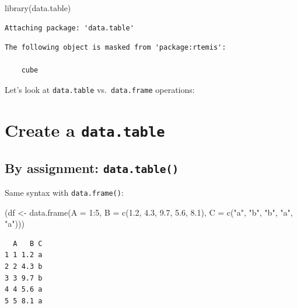 \documentclass[
]{book}
\newenvironment{Shaded}{\begin{snugshade}}{\end{snugshade}}
\newcommand{\AttributeTok}[1]{\textcolor[rgb]{0.77,0.63,0.00}{#1}}
\newcommand{\DecValTok}[1]{\textcolor[rgb]{0.00,0.00,0.81}{#1}}
\newcommand{\FloatTok}[1]{\textcolor[rgb]{0.00,0.00,0.81}{#1}}
\newcommand{\FunctionTok}[1]{\textcolor[rgb]{0.00,0.00,0.00}{#1}}
\newcommand{\NormalTok}[1]{#1}
\newcommand{\OtherTok}[1]{\textcolor[rgb]{0.56,0.35,0.01}{#1}}
\newcommand{\SpecialCharTok}[1]{\textcolor[rgb]{0.00,0.00,0.00}{#1}}
\newcommand{\StringTok}[1]{\textcolor[rgb]{0.31,0.60,0.02}{#1}}
\begin{document}
\begin{Shaded}
\begin{Highlighting}[]
\FunctionTok{library}\NormalTok{(data.table)}
\end{Highlighting}
\end{Shaded}

\begin{verbatim}
Attaching package: 'data.table'
\end{verbatim}

\begin{verbatim}
The following object is masked from 'package:rtemis':

    cube
\end{verbatim}

Let's look at \texttt{data.table} vs.~\texttt{data.frame} operations:

\hypertarget{create-a-data.table}{%
\section{\texorpdfstring{Create a \texttt{data.table}}{Create a data.table}}\label{create-a-data.table}}

\hypertarget{by-assignment-data.table}{%
\subsection{\texorpdfstring{By assignment: \texttt{data.table()}}{By assignment: data.table()}}\label{by-assignment-data.table}}

Same syntax with \texttt{data.frame()}:

\begin{Shaded}
\begin{Highlighting}[]
\NormalTok{(df }\OtherTok{\textless{}{-}} \FunctionTok{data.frame}\NormalTok{(}\AttributeTok{A =} \DecValTok{1}\SpecialCharTok{:}\DecValTok{5}\NormalTok{,}
                  \AttributeTok{B =} \FunctionTok{c}\NormalTok{(}\FloatTok{1.2}\NormalTok{, }\FloatTok{4.3}\NormalTok{, }\FloatTok{9.7}\NormalTok{, }\FloatTok{5.6}\NormalTok{, }\FloatTok{8.1}\NormalTok{),}
                  \AttributeTok{C =} \FunctionTok{c}\NormalTok{(}\StringTok{"a"}\NormalTok{, }\StringTok{"b"}\NormalTok{, }\StringTok{"b"}\NormalTok{, }\StringTok{"a"}\NormalTok{, }\StringTok{"a"}\NormalTok{)))}
\end{Highlighting}
\end{Shaded}

\begin{verbatim}
  A   B C
1 1 1.2 a
2 2 4.3 b
3 3 9.7 b
4 4 5.6 a
5 5 8.1 a
\end{verbatim}
\end{document}

